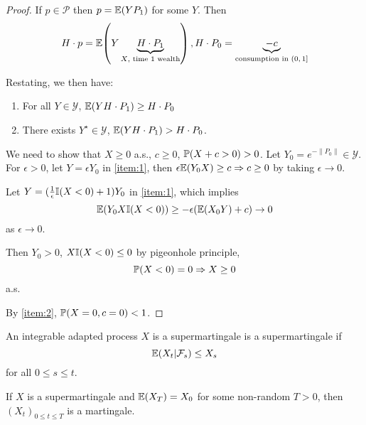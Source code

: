 \begin{proof}
  If $p \in \mathcal{P}$ then $p = \E{YP_{1}}$ for some $Y$.  Then
  \begin{equation}
    \label{eq:6}
    H \cdot p = \E{Y \underbrace{H \cdot P_{1}}_{\text{$X$,
          time 1 wealth}}}, H \cdot P_{0} =
    \underbrace{-c}_{\text{consumption in $(0, 1]$}}
  \end{equation}

  Restating, we then have:
  \begin{enumerate}
  \item \label{item:1} For all $Y \in \mathcal{Y}$, $\E{YH \cdot P_{1}} \geq H \cdot
    P_{0}$
  \item \label{item:2} There exists $Y^{\star} \in \mathcal{Y}$, $\E{Y H \cdot P_{1}} > H
    \cdot P_{0}$.
  \end{enumerate}
  

  We need to show that $X \geq 0$ a.s., $c \geq 0$, $\Prob{X + c > 0}
  > 0$.  Let $Y_{0} = e^{-\| P_{0} \|} \in \mathcal{Y}$.  For
  $\epsilon > 0$, let $Y = \epsilon Y_{0}$ in \ref{item:1}, then $\epsilon
  \E{Y_0 X} \geq c \Rightarrow c \geq 0$ by taking $\epsilon
  \rightarrow 0$.

  Let $Y = ( \frac{1}{\epsilon} \I{X < 0} + 1) Y_{0}$ in \ref{item:1}, which
  implies
  \begin{equation}
    \label{eq:7}
    \E{Y_{0} X \I{X < 0}} \geq - \epsilon (\E{X_{0} Y} + c)
    \rightarrow 0
  \end{equation} as $\epsilon \rightarrow 0$.

  Then $Y_{0} > 0$, $X\I{X < 0} \leq 0$ by pigeonhole principle,
  \begin{equation}
    \label{eq:8}
    \Prob{X < 0} = 0 \Rightarrow X \geq 0
  \end{equation} a.s.

  By \ref{item:2}, $\Prob{X = 0, c = 0} < 1$.
\end{proof}

\begin{defn}
  \label{defn:discrete_time_models:14}
  An integrable adapted process $X$ is a supermartingale is a
  supermartingale if
  \begin{equation}
    \label{eq:9}
    \E{X_{t} | \mathcal{F}_{s}} \leq X_{s}
  \end{equation} for all $0 \leq s \leq t$.
\end{defn}

\begin{proposition}
  If $X$ is a supermartingale and $\E{X_{T}} = X_{0}$ for some
  non-random $T > 0$, then $(X_{t})_{0 \leq t \leq T}$ is a martingale.
\end{proposition}

